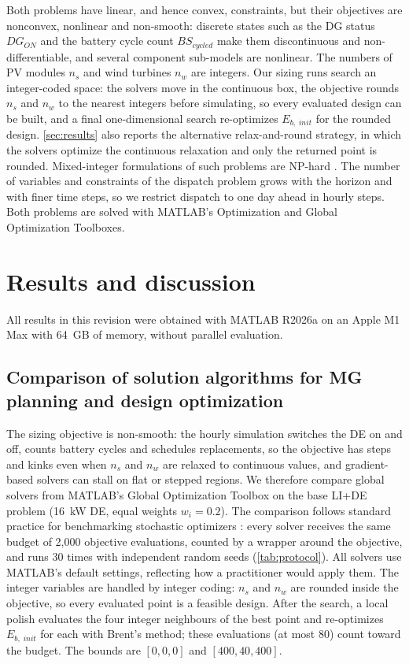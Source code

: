 \documentclass[final,3p,times]{elsarticle}
\begin{document}
Both problems have linear, and hence convex, constraints, but their objectives are nonconvex, nonlinear and non-smooth: discrete states such as the DG status $DG_{ON}$ and the battery cycle count $BS_{cycled}$ make them discontinuous and non-differentiable, and several component sub-models are nonlinear. The numbers of PV modules $n_s$ and wind turbines $n_w$ are integers. Our sizing runs search an integer-coded space: the solvers move in the continuous box, the objective rounds $n_s$ and $n_w$ to the nearest integers before simulating, so every evaluated design can be built, and a final one-dimensional search re-optimizes $E_{b,\;init}$ for the rounded design. \cref{sec:results} also reports the alternative relax-and-round strategy, in which the solvers optimize the continuous relaxation and only the returned point is rounded. Mixed-integer formulations of such problems are NP-hard \cite{parisio2013}. The number of variables and constraints of the dispatch problem grows with the horizon and with finer time steps, so we restrict dispatch to one day ahead in hourly steps. Both problems are solved with MATLAB's Optimization and Global Optimization Toolboxes.

\section{Results and discussion \label{sec:results}}

All results in this revision were obtained with MATLAB R2026a on an Apple M1 Max with 64~GB of memory, without parallel evaluation.

\subsection{Comparison of solution algorithms for MG planning and design optimization}

The sizing objective is non-smooth: the hourly simulation switches the DE on and off, counts battery cycles and schedules replacements, so the objective has steps and kinks even when $n_s$ and $n_w$ are relaxed to continuous values, and gradient-based solvers can stall on flat or stepped regions. We therefore compare global solvers from MATLAB's Global Optimization Toolbox on the base LI+DE problem (16~kW DE, equal weights $w_i = 0.2$). The comparison follows standard practice for benchmarking stochastic optimizers \cite{hansen2021coco, derrac2011tutorial}: every solver receives the same budget of 2,000 objective evaluations, counted by a wrapper around the objective, and runs 30 times with independent random seeds (\cref{tab:protocol}). All solvers use MATLAB's default settings, reflecting how a practitioner would apply them. The integer variables are handled by integer coding: $n_s$ and $n_w$ are rounded inside the objective, so every evaluated point is a feasible design. After the search, a local polish evaluates the four integer neighbours of the best point and re-optimizes $E_{b,\;init}$ for each with Brent's method; these evaluations (at most 80) count toward the budget. The bounds are $[0, 0, 0]$ and $[400, 40, 400]$.
\end{document}
